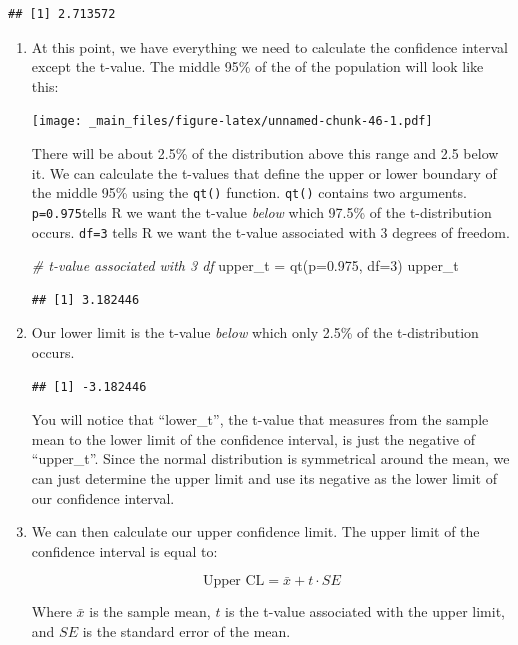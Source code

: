 \documentclass[
]{book}
\newenvironment{Shaded}{\begin{snugshade}}{\end{snugshade}}
\newcommand{\AttributeTok}[1]{\textcolor[rgb]{0.77,0.63,0.00}{#1}}
\newcommand{\CommentTok}[1]{\textcolor[rgb]{0.56,0.35,0.01}{\textit{#1}}}
\newcommand{\DecValTok}[1]{\textcolor[rgb]{0.00,0.00,0.81}{#1}}
\newcommand{\FloatTok}[1]{\textcolor[rgb]{0.00,0.00,0.81}{#1}}
\newcommand{\FunctionTok}[1]{\textcolor[rgb]{0.00,0.00,0.00}{#1}}
\newcommand{\NormalTok}[1]{#1}
\newcommand{\OtherTok}[1]{\textcolor[rgb]{0.56,0.35,0.01}{#1}}
\begin{document}
\begin{verbatim}
## [1] 2.713572
\end{verbatim}

\begin{enumerate}
\def\labelenumi{\arabic{enumi}.}
\setcounter{enumi}{4}
\item
  At this point, we have everything we need to calculate the
  confidence interval except the t-value. The middle 95\% of the of the
  population will look like this:

  \texttt{[image: \_main\_files/figure-latex/unnamed-chunk-46-1.pdf]}

  There will be about 2.5\% of the distribution above this range and
  2.5 below it. We can calculate the t-values that define the upper or
  lower boundary of the middle 95\% using the \texttt{qt()} function. \texttt{qt()}
  contains two arguments. \texttt{p=0.975}tells R we want the t-value \emph{below}
  which 97.5\% of the t-distribution occurs. \texttt{df=3} tells R we want the
  t-value associated with 3 degrees of freedom.

\begin{Shaded}
\begin{Highlighting}[]
\CommentTok{\# t{-}value associated with 3 df}
\NormalTok{upper\_t }\OtherTok{=} \FunctionTok{qt}\NormalTok{(}\AttributeTok{p=}\FloatTok{0.975}\NormalTok{, }\AttributeTok{df=}\DecValTok{3}\NormalTok{)}
\NormalTok{upper\_t}
\end{Highlighting}
\end{Shaded}

\begin{verbatim}
## [1] 3.182446
\end{verbatim}
\item
  Our lower limit is the t-value \emph{below} which only 2.5\% of the
  t-distribution occurs.

\begin{verbatim}
## [1] -3.182446
\end{verbatim}

  You will notice that ``lower\_t'', the t-value that measures from the
  sample mean to the lower limit of the confidence interval, is just
  the negative of ``upper\_t''. Since the normal distribution is
  symmetrical around the mean, we can just determine the upper limit
  and use its negative as the lower limit of our confidence interval.
\item
  We can then calculate our upper confidence limit. The upper limit of
  the confidence interval is equal to:

  \[
  \text{Upper CL} = \bar{x} + t \cdot SE
  \]

  Where \(\bar{x}\) is the sample mean, \(t\) is the t-value associated
  with the upper limit, and \(SE\) is the standard error of the mean.
\end{enumerate}
\end{document}
